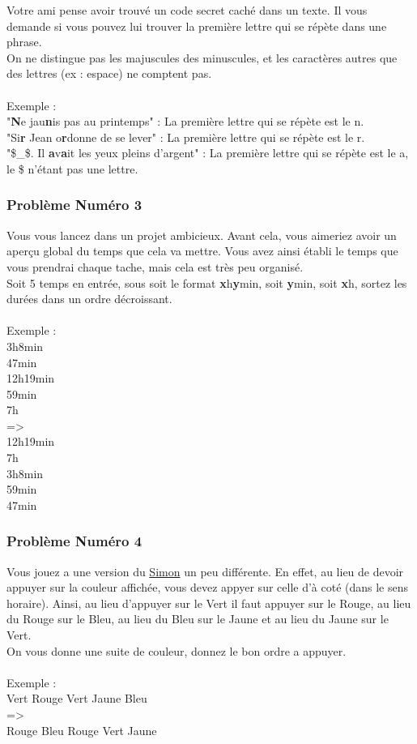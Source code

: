 \documentclass[12pt]{article}
\begin{document}
Votre ami pense avoir trouvé un code secret caché dans un texte. Il vous demande si vous pouvez lui trouver la première lettre qui se répète dans une phrase.\\
On ne distingue pas les majuscules des minuscules, et les caractères autres que des lettres (ex : espace) ne comptent pas.
\\\\
Exemple :\\
"\textbf{N}e jau\textbf{n}is pas au printemps" : La première lettre qui se répète est le n.\\
"Si\textbf{r} Jean o\textbf{r}donne de se lever" : La première lettre qui se répète est le r.\\
"\$\_\$. Il \textbf{a}v\textbf{a}it les yeux pleins d'argent" : La première lettre qui se répète est le a, le \$ n'étant pas une lettre.

\subsubsection{Problème Numéro 3}

Vous vous lancez dans un projet ambicieux. Avant cela, vous aimeriez avoir un aperçu global du temps que cela va mettre. Vous avez ainsi établi le temps que vous prendrai chaque tache, mais cela est très peu organisé.\\
Soit 5 temps en entrée, sous soit le format \textbf{x}h\textbf{y}min, soit \textbf{y}min, soit \textbf{x}h, sortez les durées dans un ordre décroissant.
\\\\
Exemple :\\
3h8min\\
47min\\
12h19min\\
59min\\
7h\\
=\textgreater\\
12h19min\\
7h\\
3h8min\\
59min\\
47min\\

\subsubsection{Problème Numéro 4}

Vous jouez a une version du \href{https://fr.wikipedia.org/wiki/Simon_(jeu)}{Simon} un peu différente. En effet, au lieu de devoir appuyer sur la couleur affichée, vous devez appyer sur celle d'à coté (dans le sens horaire). Ainsi, au lieu d'appuyer sur le Vert il faut appuyer sur le Rouge, au lieu du Rouge sur le Bleu, au lieu du Bleu sur le Jaune et au lieu du Jaune sur le Vert.\\
On vous donne une suite de couleur, donnez le bon ordre a appuyer.
\\\\
Exemple :\\
Vert Rouge Vert Jaune Bleu\\
=\textgreater\\
Rouge Bleu Rouge Vert Jaune
\end{document}
